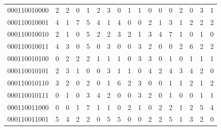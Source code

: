 \documentclass[10pt,a4paper]{article}
\begin{document}
\begin{longtable}{ |c|c|c|c|c|c|c|c|c|c|c|c|c|c|c|c|c| }
    000110010000              & 2                            & 2                                & 0                            & 1                              & 2   & 3   & 0   & 1   & 1   & 0   & 0   & 0   & 2   & 0   & 3   & 1   \\
    000110010001              & 4                            & 1                                & 7                            & 5                              & 4   & 1   & 4   & 0   & 0   & 2   & 1   & 3   & 1   & 2   & 2   & 2   \\
    000110010010              & 2                            & 1                                & 0                            & 5                              & 2   & 2   & 3   & 2   & 1   & 3   & 4   & 7   & 1   & 0   & 1   & 0   \\
    000110010011              & 4                            & 3                                & 0                            & 5                              & 0   & 3   & 0   & 0   & 3   & 2   & 0   & 0   & 2   & 6   & 2   & 2   \\
    000110010100              & 0                            & 2                                & 2                            & 2                              & 1   & 1   & 1   & 0   & 3   & 3   & 0   & 1   & 0   & 1   & 1   & 1   \\
    000110010101              & 2                            & 3                                & 1                            & 0                              & 0   & 3   & 1   & 1   & 0   & 4   & 2   & 4   & 3   & 4   & 2   & 0   \\
    000110010110              & 3                            & 2                                & 0                            & 2                              & 0   & 1   & 6   & 2   & 3   & 0   & 0   & 1   & 1   & 2   & 1   & 2   \\
    000110010111              & 0                            & 1                                & 0                            & 3                              & 4   & 2   & 0   & 0   & 3   & 2   & 0   & 1   & 0   & 0   & 1   & 1   \\
    000110011000              & 0                            & 0                                & 1                            & 7                              & 1   & 1   & 0   & 2   & 1   & 0   & 2   & 2   & 1   & 2   & 5   & 4   \\
    000110011001              & 5                            & 4                                & 2                            & 2                              & 0   & 5   & 5   & 0   & 0   & 2   & 2   & 5   & 1   & 3   & 2   & 0   \\

\end{longtable}
\end{document}
